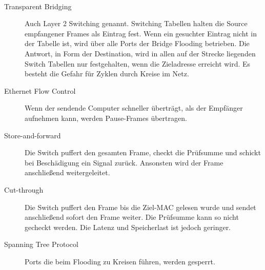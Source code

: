 \documentclass[a4paper]{article}
\begin{document}
\begin{description}[style=unboxed,leftmargin=0cm]
    \item[Ethernet-Frame]\hfill\\
\end{description}

\begin{description}
    \item[Transparent Bridging] Auch Layer 2 Switching genannt. Switching Tabellen halten die Source empfangener Frames als Eintrag fest. Wenn ein gesuchter Eintrag nicht in der Tabelle ist, wird über alle Ports der Bridge Flooding betrieben. Die Antwort, in Form der Destination, wird in allen auf der Strecke liegenden Switch Tabellen nur festgehalten, wenn die Zieladresse erreicht wird. Es besteht die Gefahr für Zyklen durch Kreise im Netz.
    \item[Ethernet Flow Control] Wenn der sendende Computer schneller überträgt, als der Empfänger aufnehmen kann, werden Pause-Frames übertragen.
    \item[Store-and-forward] Die Switch puffert den gesamten Frame, checkt die Prüfsumme und schickt bei Beschädigung ein Signal zurück. Ansonsten wird der Frame anschließend weitergeleitet.
    \item[Cut-through] Die Switch puffert den Frame bis die Ziel-MAC gelesen wurde und sendet anschließend sofort den Frame weiter. Die Prüfsumme kann so nicht gecheckt werden. Die Latenz und Speicherlast ist jedoch geringer.
    \item[Spanning Tree Protocol] Ports die beim Flooding zu Kreisen führen, werden gesperrt.
\end{description}
\end{document}
